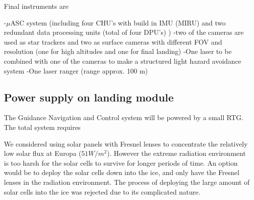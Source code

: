 Final instruments are 

-$\mu$ASC system (including four CHU's with build in IMU (MIRU) and two redundant data processing units (total of four DPU's) )
-two of the cameras are used as star trackers and two as surface cameras with different FOV and resolution (one for high altitudes and one for final landing)
-One laser to be combined with one of the cameras to make a structured light hazard avoidance system
-One laser ranger (range approx. 100 m)


\subsection{Power supply on landing module}

The Guidance Navigation and Control system will be powered by a small RTG. The total system requires 

We considered using solar panels with Fresnel lenses to concentrate the relatively low solar flux at Europa ($51 W/m^2$). However the extreme radiation environment is too harsh for the solar cells to survive for longer periods of time. An option would be to deploy the solar cells down into the ice, and only have the Fresnel lenses in the radiation environment. The process of deploying the large amount of solar cells into the ice was rejected due to its complicated nature. 





